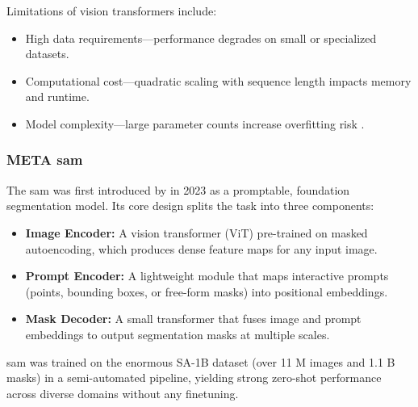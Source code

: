 Limitations of vision transformers include:
\begin{itemize}

    \item High data requirements—performance degrades on small or specialized datasets.  
    \item Computational cost—quadratic scaling with sequence length impacts memory and runtime.  
    \item Model complexity—large parameter counts increase overfitting risk \cite{lee_enhancing_mamba_s6_2024}.
\end{itemize}


\subsubsection{META \acrlong{sam}}
\label{ssec:meta_sam2}
The \acrfull{sam} was first introduced by \textcite{kirillov_segment_2023} in 2023 as a promptable, foundation segmentation model. Its core design splits the task into three components:
\begin{itemize}
    \item \textbf{Image Encoder:} A vision transformer (ViT) pre-trained on masked autoencoding, which produces dense feature maps for any input image.
    \item \textbf{Prompt Encoder:} A lightweight module that maps interactive prompts (points, bounding boxes, or free-form masks) into positional embeddings.
    \item \textbf{Mask Decoder:} A small transformer that fuses image and prompt embeddings to output segmentation masks at multiple scales.
\end{itemize}
\acrshort{sam} was trained on the enormous SA-1B dataset (over 11 M images and 1.1 B masks) in a semi-automated pipeline, yielding strong zero-shot performance across diverse domains without any finetuning.

